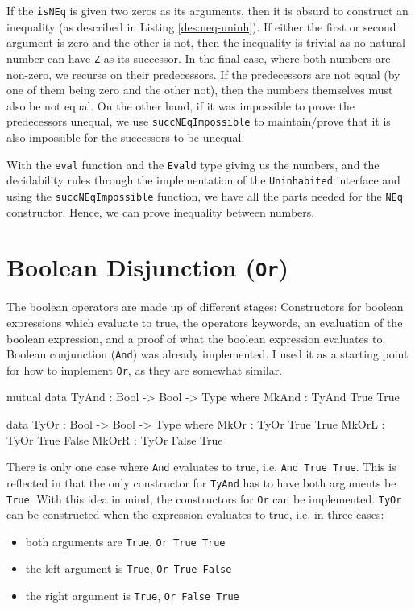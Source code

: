     If the \texttt{isNEq} is given two zeros as its arguments, then it is absurd to construct an inequality (as described in Listing \ref{des:neq-uninh}). If either the first or second argument is zero and the other is not, then the inequality is trivial as no natural number can have \texttt{Z} as its successor. In the final case, where both numbers are non-zero, we recurse on their predecessors. If the predecessors are not equal (by one of them being zero and the other not), then the numbers themselves must also be not equal. On the other hand, if it was impossible to prove the predecessors unequal, we use \texttt{succNEqImpossible} to maintain/prove that it is also impossible for the successors to be unequal.
    \\\par
    
    With the \texttt{eval} function and the \texttt{Evald} type giving us the numbers, and the decidability rules through the implementation of the \texttt{Uninhabited} interface and using the \texttt{succNEqImpossible} function, we have all the parts needed for the \texttt{NEq} constructor. Hence, we can prove inequality between numbers.
    
\section{Boolean Disjunction (\texttt{Or})}
    The boolean operators are made up of different stages: Constructors for boolean expressions which evaluate to true, the operators keywords, an evaluation of the boolean expression, and a proof of what the boolean expression evaluates to. Boolean conjunction (\texttt{And}) was already implemented. I used it as a starting point for how to implement \texttt{Or}, as they are somewhat similar.
    
    \begin{code}[label={des:tyand-or}, caption={The constructors for true \texttt{And} and \texttt{Or} statements}, escapeinside={(*}{*)}]
        mutual
            data TyAnd : Bool -> Bool -> Type where
                MkAnd  : TyAnd True True
            
            data TyOr : Bool -> Bool -> Type where
                MkOr  : TyOr True True
                MkOrL : TyOr True False
                MkOrR : TyOr False True
    \end{code}

    There is only one case where \texttt{And} evaluates to true, i.e. \texttt{And True True}. This is reflected in that the only constructor for \texttt{TyAnd} has to have both arguments be \texttt{True}. With this idea in mind, the constructors for \texttt{Or} can be implemented. \texttt{TyOr} can be constructed when the expression evaluates to true, i.e. in three cases:
    \begin{itemize}
        \item both arguments are \texttt{True}, \texttt{Or True True}
        \item the left argument is \texttt{True}, \texttt{Or True False}
        \item the right argument is \texttt{True}, \texttt{Or False True}
    \end{itemize}
    
